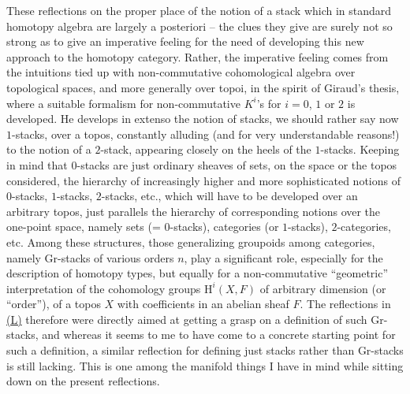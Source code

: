 \label{sec:16}%
These reflections on the proper place of the notion of a stack which in
standard homotopy algebra are largely a posteriori -- the clues they
give are surely not so strong as to give an imperative feeling for the
need of developing this new approach to the homotopy category. Rather,
the imperative feeling comes from the intuitions tied up with
non-commutative cohomological algebra over topological spaces, and
more generally over topoi, in the spirit of Giraud's thesis, where a
suitable formalism for non-commutative $K^i$'s for $i=0$, $1$ or $2$
is developed. He develops in extenso the notion of stacks, we should
rather say now $1$-stacks, over a topos, constantly alluding (and for
very understandable reasons!) to the notion of a $2$-stack, appearing
closely on the heels of the $1$-stacks. Keeping in mind that
$0$-stacks are just ordinary sheaves of sets, on the space or the
topos considered, the hierarchy of increasingly higher and more sophisticated notions of
$0$-stacks, $1$-stacks, $2$-stacks, etc., which will have to be
developed over an arbitrary topos, just parallels the hierarchy of
corresponding notions over the one-point space, namely
sets (= $0$-stacks), categories (or $1$-stacks), $2$-categories, etc.
Among these structures, those generalizing groupoids among categories,
namely Gr-stacks of various orders $n$, play a significant role,
especially for the description of homotopy types, but equally for a
non-commutative ``geometric'' interpretation of the cohomology groups
$\mathrm H^i(X,F)$ of arbitrary dimension (or ``order''), of a topos $X$ with
coefficients in an abelian sheaf $F$. The reflections in \hyperref[ch:I]{(L)} therefore
were directly aimed at getting a grasp on a definition of such
Gr-stacks, and whereas it seems to me to have come to a concrete
starting point for such a definition, a similar reflection for
defining just stacks rather than Gr-stacks is still lacking. This is
one among the manifold things I have in mind while sitting down on the
present reflections.

